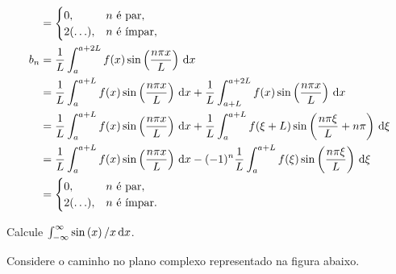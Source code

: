 \documentclass[a4paper,12pt, leqno, answers]{exam}
\begin{document}
\begin{questions}
\begin{solution}
\begin{align*}
            &= \begin{cases}
                0, & n \text{ \'{e} par}, \\
                2(\ldots), & n \text{ \'{e} \'{i}mpar},
            \end{cases} \\
            b_n &= \frac{1}{L} \int_a^{a + 2 L} f(x) \sin\left( \frac{n \pi x}{L} \right) \, \mathrm{d}x \\
            &= \frac{1}{L} \int_a^{a + L} f(x) \sin\left( \frac{n \pi x}{L} \right) \, \mathrm{d}x + \frac{1}{L} \int_{a + L}^{a + 2 L} f(x) \sin\left( \frac{n \pi x}{L} \right) \, \mathrm{d}x \\
            &= \frac{1}{L} \int_a^{a + L} f(x) \sin\left( \frac{n \pi x}{L} \right) \, \mathrm{d}x + \frac{1}{L} \int_a^{a + L} f(\xi + L) \sin\left( \frac{n \pi \xi}{L} + n \pi \right) \, \mathrm{d}\xi \\
            &= \frac{1}{L} \int_a^{a + L} f(x) \sin\left( \frac{n \pi x}{L} \right) \, \mathrm{d}x - (-1)^n \frac{1}{L} \int_a^{a + L} f(\xi) \sin\left( \frac{n \pi \xi}{L} \right) \, \mathrm{d}\xi \\
            &= \begin{cases}
                0, & n \text{ \'{e} par}, \\
                2 (\ldots), & n \text{ \'{e} \'{i}mpar}.
            \end{cases}
        \end{align*}
    \end{solution}

    \question[T2 de 2008] Calcule $\int_{-\infty}^\infty \sin\left( x \right) / x \, \mathrm{d}x$.
    \begin{solution}
        Considere o caminho no plano complexo representado na figura abaixo.
        \begin{center}
        \end{center}


\end{solution}
\end{questions}
\end{document}
